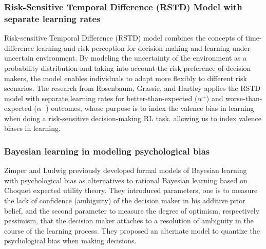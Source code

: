 \documentclass[10pt,letterpaper]{article}
\begin{document}
\subsubsection{Risk-Sensitive Temporal Difference (RSTD) Model with separate learning rates}
Risk-sensitive Temporal Difference (RSTD) model combines the concepts of time-difference learning and risk perception for decision making and learning under uncertain environment. By modeling the uncertainty of the environment as a probability distribution and taking into account the risk preference of decision makers, the model enables individuals to adapt more flexibly to different risk scenarios. The research from Rosenbaum, Grassie, and Hartley \cite{RSTD} applies the RSTD model with separate learning rates for better-than-expected ($\alpha^+$) and worse-than-expected ($\alpha^-$) outcomes, whose purpose is to index the valence bias in learning when doing a risk-sensitive decision-making RL task.
allowing us to index valence biases in learning. 
\subsubsection{Bayesian learning in modeling psychological bias}
Zimper and Ludwig previously developed formal models of Bayesian learning with psychological bias as alternatives to rational Bayesian learning based on Choquet expected utility theory. They introduced parameters, one is to measure the lack of confidence (ambiguity) of the decision maker in his additive prior belief, and the second parameter to measure the degree of optimism, respectively pessimism, that the decision maker attaches to a resolution of ambiguity in the course of the learning process. They proposed an alternate model to quantize the psychological bias when making decisions. \cite{baye}
\end{document}

